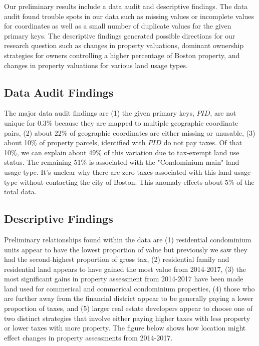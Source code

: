 \documentclass[12pt]{article}
\begin{document}
Our preliminary results include a data audit and descriptive findings.
The data audit found trouble spots in our data such as missing values or
incomplete values for coordinates as well as a small number of duplicate
values for the given primary keys. The descriptive findings generated
possible directions for our research question such as changes in 
property valuations, dominant ownership strategies for owners 
controlling a higher percentage of Boston property, and changes in
property valuations for various land usage types.

\subsection{Data Audit Findings}

The major data audit findings are (1) the given primary keys, $PID$, are 
not unique for 0.3\% because they are mapped to multiple geographic 
coordinate pairs, (2) about 22\% of geographic coordinates are either 
missing or unusable, (3) about 10\% of property parcels, identified with
$PID$ do not pay taxes. Of that 10\%, we can explain about 49\% of this 
variation due to tax-exempt land use status. The remaining 51\% is 
associated with the "Condominium main" land usage type. It's unclear why 
there are zero taxes associated with this land usage type without 
contacting the city of Boston. This anomaly effects about 5\% of the 
total data.

\subsection{Descriptive Findings}
Preliminary relationships found within the data are (1) residential 
condominium units appear to have the lowest proportion of value but 
previously we saw they had the second-highest proportion of gross tax,
(2) residential family and residential land appears to have gained the 
most value from 2014-2017, (3) the most significant gains in property
assessment from 2014-2017 have been made land used for commerical and
commerical condominium properties, (4) those who are further away from 
the financial district appear to be generally paying a lower proportion 
of taxes, and (5) larger real estate developers appear to choose one
of two distinct strategies that involve either paying higher taxes with
less property or lower taxes with more property. The figure below shows
how location might effect changes in property assessments from 2014-2017.
\end{document}
